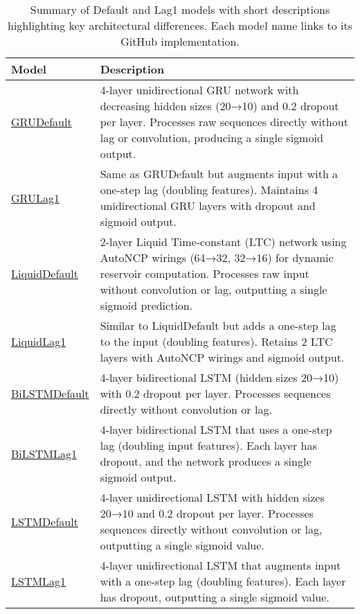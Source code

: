 \begin{table}[h!]
\centering
\renewcommand{\arraystretch}{1.5}
\begin{tabular}{lp{10cm}}
\toprule
\textbf{Model} & \textbf{Description} \\
\midrule
\href{https://github.com/As17-01/brain_signals/blob/main/src/models/GRUDefault.py}{GRUDefault} & 4-layer unidirectional GRU network with decreasing hidden sizes (20→10) and 0.2 dropout per layer. Processes raw sequences directly without lag or convolution, producing a single sigmoid output. \\

\href{https://github.com/As17-01/brain_signals/blob/main/src/models/GRULag1.py}{GRULag1} & Same as GRUDefault but augments input with a one-step lag (doubling features). Maintains 4 unidirectional GRU layers with dropout and sigmoid output. \\

\href{https://github.com/As17-01/brain_signals/blob/main/src/models/LiquidDefault.py}{LiquidDefault} & 2-layer Liquid Time-constant (LTC) network using AutoNCP wirings (64→32, 32→16) for dynamic reservoir computation. Processes raw input without convolution or lag, outputting a single sigmoid prediction. \\

\href{https://github.com/As17-01/brain_signals/blob/main/src/models/LiquidLag1.py}{LiquidLag1} & Similar to LiquidDefault but adds a one-step lag to the input (doubling features). Retains 2 LTC layers with AutoNCP wirings and sigmoid output. \\

\href{https://github.com/As17-01/brain_signals/blob/main/src/models/BiLSTMDefault.py}{BiLSTMDefault} & 4-layer bidirectional LSTM (hidden sizes 20→10) with 0.2 dropout per layer. Processes sequences directly without convolution or lag. \\

\href{https://github.com/As17-01/brain_signals/blob/main/src/models/BiLSTMLag1.py}{BiLSTMLag1} & 4-layer bidirectional LSTM that uses a one-step lag (doubling input features). Each layer has dropout, and the network produces a single sigmoid output. \\

\href{https://github.com/As17-01/brain_signals/blob/main/src/models/LSTMDefault.py}{LSTMDefault} & 4-layer unidirectional LSTM with hidden sizes 20→10 and 0.2 dropout per layer. Processes sequences directly without convolution or lag, outputting a single sigmoid value. \\

\href{https://github.com/As17-01/brain_signals/blob/main/src/models/LSTMLag1.py}{LSTMLag1} & 4-layer unidirectional LSTM that augments input with a one-step lag (doubling features). Each layer has dropout, outputting a single sigmoid value. \\
\bottomrule
\end{tabular}
\caption{Summary of Default and Lag1 models with short descriptions highlighting key architectural differences. Each model name links to its GitHub implementation.}
\label{tab:model_descriptions}
\end{table}

